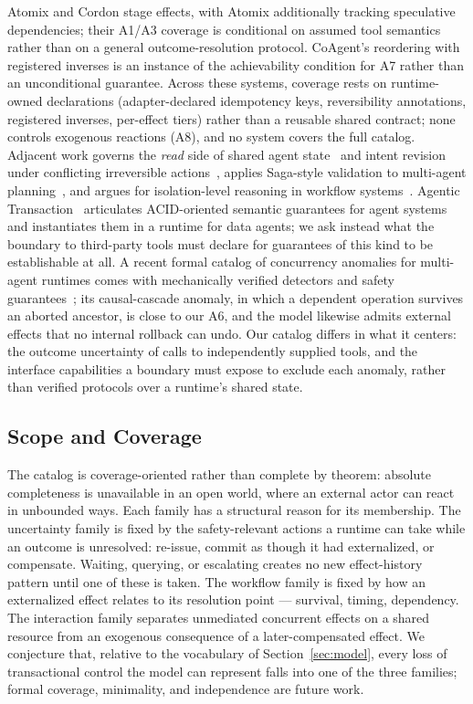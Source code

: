 \documentclass{article}
\begin{document}
Atomix and Cordon stage effects, with Atomix additionally tracking
speculative dependencies; their A1/A3 coverage is conditional on assumed
tool semantics rather than on a general outcome-resolution protocol. CoAgent's reordering with registered inverses is an instance of the
achievability condition for A7 rather than an unconditional guarantee. Across these systems, coverage rests on runtime-owned declarations (adapter-declared idempotency keys, reversibility annotations, registered inverses, per-effect tiers) rather than a reusable shared contract; none controls exogenous reactions (A8), and no
system covers the full catalog. Adjacent work governs the \emph{read} side
of shared agent state~\cite{khan2026sbus} and intent revision under
conflicting irreversible actions~\cite{zhai2026revisable}, applies Saga-style validation to multi-agent planning~\cite{chang2025sagallm}, and
argues for isolation-level reasoning in workflow
systems~\cite{stonebraker2025consistency}. Agentic
Transaction~\cite{sun2026agentic} articulates ACID-oriented semantic
guarantees for agent systems and instantiates them in a runtime for data
agents; we ask instead what the boundary to third-party tools must declare
for guarantees of this kind to be establishable at all. A recent formal
catalog of concurrency anomalies for multi-agent runtimes comes with
mechanically verified detectors and safety
guarantees~\cite{khan2026verified}; its causal-cascade anomaly, in which a
dependent operation survives an aborted ancestor, is close to our A6, and
the model likewise admits external effects that no internal rollback can
undo. Our catalog differs in what it centers: the outcome uncertainty of
calls to independently supplied tools, and the interface capabilities a
boundary must expose to exclude each anomaly, rather than verified
protocols over a runtime's shared state.

\subsection{Scope and Coverage}
\label{sec:coverage}

The catalog is coverage-oriented rather than complete by theorem: absolute
completeness is unavailable in an open world, where an external actor can
react in unbounded ways. Each family has a structural reason for its
membership. The uncertainty family is fixed by the safety-relevant actions a runtime
can take while an outcome is unresolved: re-issue, commit as though it had
externalized, or compensate. Waiting, querying, or escalating creates no new
effect-history pattern until one of these is taken. The workflow family is fixed by how an
externalized effect relates to its resolution point --- survival, timing,
dependency. The interaction family separates unmediated concurrent effects
on a shared resource from an exogenous consequence of a later-compensated
effect. We conjecture that, relative to the vocabulary of
Section~\ref{sec:model}, every loss of transactional control the model can
represent falls into one of the three families; formal coverage,
minimality, and independence are future work.
\end{document}
